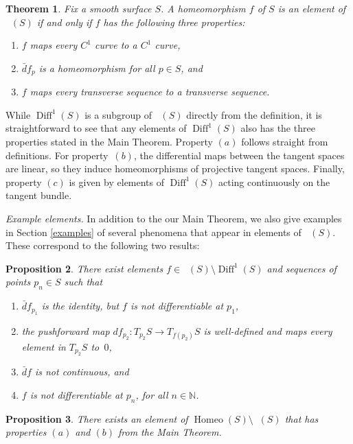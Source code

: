 \documentclass[sn-mathphys-num]{sn-jnl}%
\theoremstyle{thmstyleone}%
\newtheorem{theorem}{Theorem}%
\newtheorem{prop}[theorem]{Proposition}%
\theoremstyle{thmstyletwo}%
\theoremstyle{thmstylethree}%
\DeclareMathOperator{\homeo}{Homeo}
\DeclareMathOperator{\diff}{Diff}
\DeclareMathOperator{\thomeo}{Homeo^{1}}
\begin{document}
\begin{theorem}\label{theoremconditions}
Fix a smooth surface $S$.  A homeomorphism $f$ of $S$ is an element of $\thomeo(S)$ if and only if $f$ has the following three properties:
\begin{enumerate}[noitemsep,topsep=0pt, label=$(\alph*)$]
\item $f$ maps every $C^1$ curve to a $C^1$ curve,
\item $\bar{d}f_p$ is a homeomorphism for all $p \in S$, and 
\item $f$ maps every transverse sequence to a transverse sequence.
\end{enumerate}
\end{theorem}

\noindent While $\diff^1(S)$ is a subgroup of $\thomeo(S)$ directly from the definition, it is straightforward to see that any elements of $\diff^1(S)$ also has the three properties stated in the Main Theorem. 
Property $(a)$ follows straight from definitions.
For property~$(b)$, the differential maps between the tangent spaces are linear, so they induce homeomorphisms of projective tangent spaces.  Finally,  property $(c)$ is given by elements of $\diff^1(S)$ acting continuously on the tangent bundle.  

\medskip

\noindent \textit{Example elements.} In addition to the our Main Theorem, we also give examples in Section \ref{examples} of several phenomena that appear in elements of $\thomeo(S)$.   These correspond to the following two results:

\begin{prop}\label{propexamples}
There exist elements $f \in \thomeo(S){\setminus} \diff^1(S)$ and sequences of points $p_n \in S$ such that 
\begin{enumerate}[noitemsep,topsep=0pt, label=$(\roman*)$]
\item $\bar{d}f_{p_1}$ is the identity, but $f$ is not differentiable at $p_1$, 
\item the pushforward map $df_{p_2} : T_{p_2}S \rightarrow T_{f(p_2)}S$ is well-defined and maps every element in $T_{p_2}S$ to~$0$, 
\item $\bar{d}f$ is not continuous, and 
\item $f$ is not differentiable at $p_n$, for all $n \in \mathbb{N}$.
\end{enumerate}
\end{prop}

\begin{prop}\label{propNex}
There exists an element of $\homeo(S){\setminus} \thomeo(S)$ that has properties $(a)$ and $(b)$ from the Main Theorem.
\end{prop}
\end{document}
